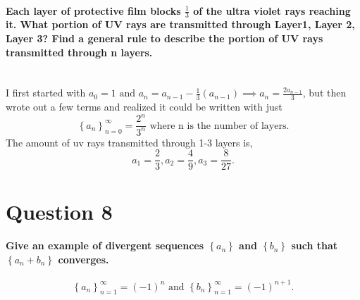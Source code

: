 \paragraph{Each layer of protective film blocks $ \frac{ 1 }{ 3 }  $ of the ultra violet rays reaching it. What portion of UV rays are transmitted through Layer1, Layer 2, Layer 3? Find a general rule to describe the portion of UV rays transmitted through n layers. \\ \\}
I first started with $ a_0 =1 \text{ and }a_n=a_{ n-1 }-\frac{ 1 }{ 3 } \left( a_{ n-1 } \right) \implies a_n= \frac{ 2a_{ n-1 } }{ 3 } $, but then wrote out a few terms and realized it could be written with just \[
\left\{ a_n \right\} _{ n=0 }^{ \infty }= \frac{ 2^{ n } }{ 3^{ n } }\text{ where n is the number of layers}
.\] 
The amount of uv rays transmitted through 1-3 layers is, 
\[
a_1 = \frac{ 2 }{ 3 } , a_2 = \frac{ 4 }{ 9 } , a_3 = \frac{ 8 }{ 27 }
.\] 	
\section*{Question 8}%
\paragraph{Give an example of divergent sequences $ \left\{ a_n \right\}  $ and $ \left\{ b_n \right\}  $ such that $ \left\{ a_n + b_n \right\}  $ converges. }
\[
\left\{ a_n \right\} _{ n=1 }^{ \infty }=\left( -1 \right) ^{ n }\text{ and }\left\{ b_n \right\} _{ n=1 }^{ \infty }=\left( -1 \right) ^{ n+1 }
.\] 



